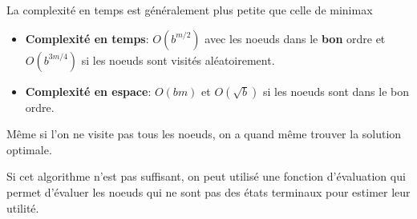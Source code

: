 \begin{remark}\leavevmode
    La complexité en temps est généralement plus petite que celle de minimax
    \begin{itemize}
        \item \textbf{Complexité en temps}: $O(b^{m/2})$ avec les noeuds dans le \textbf{bon} ordre
            et $O(b^{3m/4})$ si les noeuds sont visités aléatoirement.
        \item \textbf{Complexité en espace}: $O(bm)$ et $O(\sqrt{b})$ si les noeuds sont dans le bon ordre.
    \end{itemize}
\end{remark}

\begin{note}
    Même si l'on ne visite pas tous les noeuds, on a quand même trouver la solution optimale.
\end{note}

Si cet algorithme n'est pas suffisant, on peut utilisé une fonction d'évaluation qui permet d'évaluer les noeuds 
qui ne sont pas des états terminaux pour estimer leur utilité.

